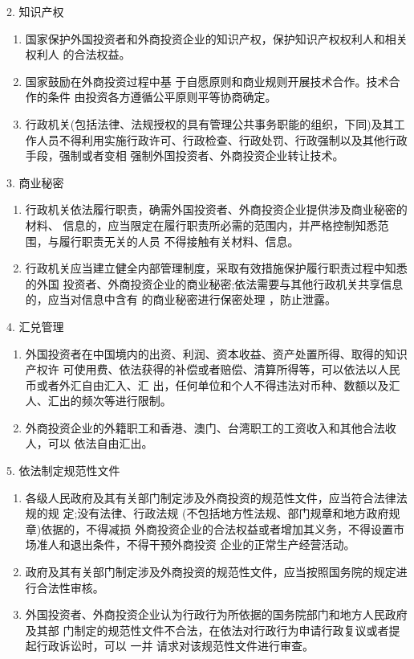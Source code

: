\documentclass[UTF8,12pt]{ctexart}
\numberwithin{equation}{section} %
\numberwithin{figure}{section}
\numberwithin{table}{section}
\begin{document}
	
	2. 知识产权 
	\begin{enumerate}
		\item 国家保护外国投资者和外商投资企业的知识产权，保护知识产权权利人和相关权利人 的合法权益。
		
		\item 国家鼓励在外商投资过程中基 于自愿原则和商业规则开展技术合作。技术合作的条件 由投资各方遵循公平原则平等协商确定。
		
		\item 行政机关(包括法律、法规授权的具有管理公共事务职能的组织，下同)及其工作人员不得利用实施行政许可、行政检查、行政处罚、行政强制以及其他行政手段，强制或者变相 强制外国投资者、外商投资企业转让技术。
		
	\end{enumerate}
	
	3. 商业秘密 
	\begin{enumerate}
		\item 行政机关依法履行职责，确需外国投资者、外商投资企业提供涉及商业秘密的材料、 信息的，应当限定在履行职责所必需的范围内，并严格控制知悉范围，与履行职责无关的人员 不得接触有关材料、信息。
		
		\item 行政机关应当建立健全内部管理制度，采取有效措施保护履行职责过程中知悉的外国 投资者、外商投资企业的商业秘密;依法需要与其他行政机关共享信息的，应当对信息中含有 的商业秘密进行保密处理 ，防止泄露。
	\end{enumerate}
	
	4. 汇兑管理
	\begin{enumerate}
		\item 外国投资者在中国境内的出资、利润、资本收益、资产处置所得、取得的知识产权许 可使用费、依法获得的补偿或者赔偿、清算所得等，可以依法以人民币或者外汇自由汇入、汇 出，任何单位和个人不得违法对币种、数额以及汇人、汇出的频次等进行限制。
		
		\item 外商投资企业的外籍职工和香港、澳门、台湾职工的工资收入和其他合法收人，可以 依法自由汇出。
	\end{enumerate}
	
	5. 依法制定规范性文件 
	\begin{enumerate}
		\item 各级人民政府及其有关部门制定涉及外商投资的规范性文件，应当符合法律法规的规 定;没有法律、行政法规 (不包括地方性法规、部门规章和地方政府规章)依据的，不得减损 外商投资企业的合法权益或者增加其义务，不得设置市场准人和退出条件，不得干预外商投资 企业的正常生产经营活动。
		
		\item 政府及其有关部门制定涉及外商投资的规范性文件，应当按照国务院的规定进行合法性审核。 
		
		\item 外国投资者、外商投资企业认为行政行为所依据的国务院部门和地方人民政府及其部 门制定的规范性文件不合法，在依法对行政行为申请行政复议或者提起行政诉讼时，可以 一并 请求对该规范性文件进行审查。
	\end{enumerate}
	
\end{document}
